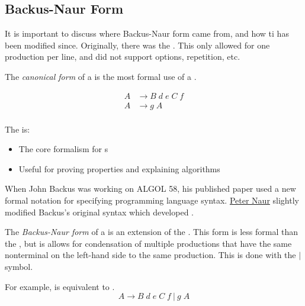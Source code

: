 \subsection{Backus-Naur Form}\label{subsec:BNF}
It is important to discuss where Backus-Naur form came from, and how ti has been modified since.
Originally, there was the .
This only allowed for one production per line, and did not support options, repetition, etc.
\begin{definition}\label{def:CFG_Canonical_Form}
  The \emph{canonical form} of a  is the most formal use of a .

  \begin{equation}\label{eq:CFG_Canonical_Form}
    \begin{aligned}
      A &\rightarrow B \; d \; e \; C \; f \\
      A &\rightarrow g \; A \\
    \end{aligned}
  \end{equation}

  The  is:
  \begin{itemize}[noitemsep]
  \item The core formalism for s
  \item Useful for proving properties and explaining algorithms
  \end{itemize}
\end{definition}

When John Backus was working on ALGOL 58, his published paper used a new formal notation for specifying programming language syntax.
\href{https://en.wikipedia.org/wiki/Peter_Naur}{Peter Naur} slightly modified Backus's original syntax which developed .

\begin{definition}\label{def:CFG_BNF_Form}
  The \emph{Backus-Naur form} of a  is an extension of the .
  This form is less formal than the , but is allows for condensation of multiple productions that have the same nonterminal on the left-hand side to the same production.
  This is done with the $\vert$ symbol.

  For example,  is equivalent to .
  \begin{equation}\label{eq:CFG_BNF_Form}
    A \rightarrow B \; d \; e \; C \; f \: \vert \: g\; A
  \end{equation}
\end{definition}

